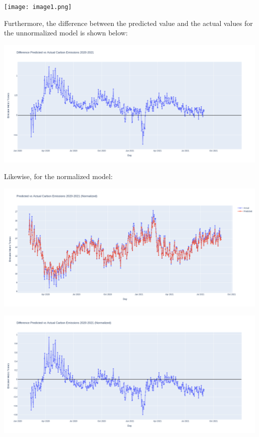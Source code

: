 \documentclass[fontsize=11pt]{article}
\begin{document}
\begin{center}
    \texttt{[image: image1.png]}
\end{center}

Furthermore, the difference between the predicted value and the actual values for the unnormalized model is shown below:

\begin{center}
    \includegraphics[scale=0.325]{image4.png}
\end{center}

Likewise, for the normalized model:

\begin{center}
    \includegraphics[scale=0.325]{image5.png}
\end{center}
\begin{center}
    \includegraphics[scale=0.325]{image2.png}
\end{center}
\end{document}
